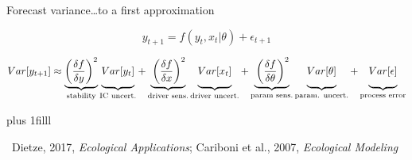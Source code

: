 \documentclass[14pt, compress, aspectratio=1610]{beamer}
\newcommand{\btVFill}{\vskip0pt plus 1filll}
\newcommand{\credit}[1]{\btVFill\par\hfill \footnotesize ~#1}
\begin{document}
\begin{frame}{%
\protect\hypertarget{forecast-varianceto-a-first-approximation-1}{%
Forecast variance\ldots{}to a first approximation}}

\[
y_{t+1} = f(y_t, x_t|\theta) + \epsilon_{t+1}
\]

\small\begin{align*}
Var[y_{t+1}] \approx \underbrace{\left(\frac{\delta f}{\delta y} \right)^2}_{\text{stability}} 
               \underbrace{\vphantom{ \left(\frac{\delta f}{\delta y} \right)^2 } Var[y_t]}_{\text{IC uncert.}} +
               \underbrace{\vphantom{ \left(\frac{\delta f}{\delta y} \right)^2 }\left(\frac{\delta f}{\delta x} \right)^2}_{\text{driver sens.}} 
               \underbrace{\vphantom{ \left(\frac{\delta f}{\delta y} \right)^2 } Var[x_t]}_{\text{driver uncert.}} +
               \underbrace{\vphantom{ \left(\frac{\delta f}{\delta y} \right)^2 }\left(\frac{\delta f}{\delta \theta} \right)^2}_{\text{param sens.}}
               \underbrace{\vphantom{ \left(\frac{\delta f}{\delta y} \right)^2 } Var[\theta]}_{\text{param. uncert.}} +
               \underbrace{\vphantom{ \left(\frac{\delta f}{\delta y} \right)^2 } Var[\epsilon]}_{\text{process error}}
\end{align*}

\credit{Dietze, 2017, \emph{Ecological Applications}; Cariboni et al., 2007, \emph{Ecological Modeling}}

\end{frame}
\end{document}
